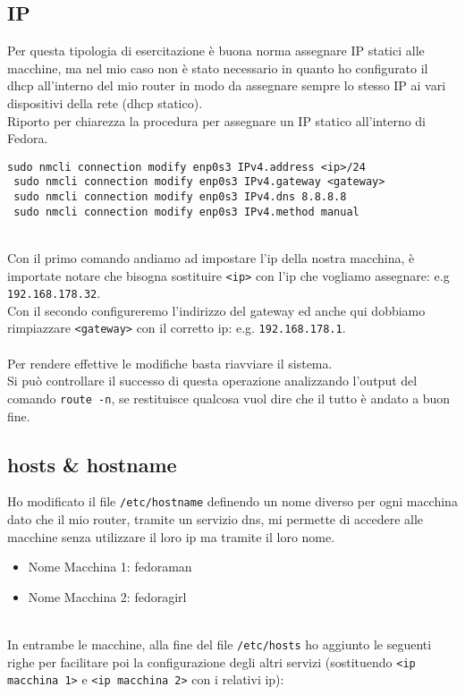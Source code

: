 \subsection{IP}

Per questa tipologia di esercitazione \`{e} buona norma assegnare IP statici alle macchine, ma nel mio caso non \`{e} stato necessario in quanto ho configurato il dhcp all'interno del mio router in modo da assegnare sempre lo stesso IP ai vari dispositivi della rete (dhcp statico).\\ %
Riporto per chiarezza la procedura per assegnare un IP statico all'interno di Fedora.

\begin{lstlisting}[style=cmd]
 sudo nmcli connection modify enp0s3 IPv4.address <ip>/24
 sudo nmcli connection modify enp0s3 IPv4.gateway <gateway>
 sudo nmcli connection modify enp0s3 IPv4.dns 8.8.8.8
 sudo nmcli connection modify enp0s3 IPv4.method manual
\end{lstlisting}
\ \\
Con il primo comando andiamo ad impostare l'ip della nostra macchina, \`{e} importate notare che bisogna sostituire \lstinline[style=cmd]|<ip>| con l'ip che vogliamo assegnare: e.g \lstinline[style=cmd]|192.168.178.32|.\\
Con il secondo configureremo l'indirizzo del gateway ed anche qui dobbiamo rimpiazzare \lstinline[style=cmd]|<gateway>| con il corretto ip: e.g. \lstinline[style=cmd]|192.168.178.1|.\\
\ \\
Per rendere effettive le modifiche basta riavviare il sistema.\\
Si pu\`{o} controllare il successo di questa operazione analizzando l'output del comando \lstinline[style=cmd]|route -n|, se restituisce qualcosa vuol dire che il tutto \`{e} andato a buon fine.

\subsection{hosts \& hostname}
\label{sec:hosts}

Ho modificato il file \lstinline[style=cmd]|/etc/hostname| definendo un nome diverso per ogni macchina dato che il mio router, tramite un servizio dns, mi permette di accedere alle macchine senza utilizzare il loro ip ma tramite il loro nome.

\begin{itemize}
	\item Nome Macchina 1: fedoraman
	\item Nome Macchina 2: fedoragirl
\end{itemize}
\ \\
In entrambe le macchine, alla fine del file \lstinline[style=cmd]|/etc/hosts| ho aggiunto le seguenti righe per facilitare poi la configurazione degli altri servizi (sostituendo \lstinline[style=cmd]|<ip macchina 1>| e \lstinline[style=cmd]|<ip macchina 2>| con i relativi ip):

